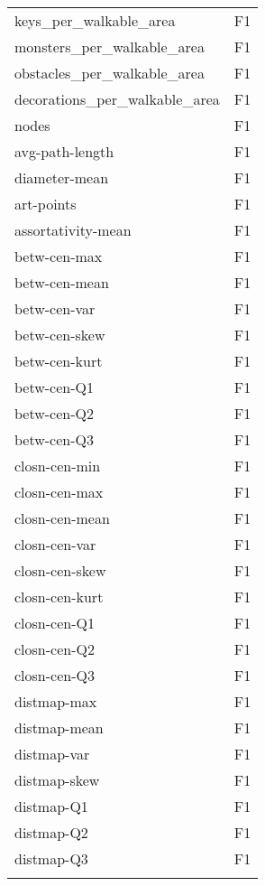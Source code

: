 \begin{longtable}{ll}
	keys\_per\_walkable\_area        &             F1 \\
	monsters\_per\_walkable\_area    &             F1 \\
	obstacles\_per\_walkable\_area   &             F1 \\
	decorations\_per\_walkable\_area &             F1 \\
	nodes                         &             F1 \\
	avg-path-length               &             F1 \\
	diameter-mean                 &             F1 \\
	art-points                    &             F1 \\
	assortativity-mean            &             F1 \\
	betw-cen-max                  &             F1 \\
	betw-cen-mean                 &             F1 \\
	betw-cen-var                  &             F1 \\
	betw-cen-skew                 &             F1 \\
	betw-cen-kurt                 &             F1 \\
	betw-cen-Q1                   &             F1 \\
	betw-cen-Q2                   &             F1 \\
	betw-cen-Q3                   &             F1 \\
	closn-cen-min                 &             F1 \\
	closn-cen-max                 &             F1 \\
	closn-cen-mean                &             F1 \\
	closn-cen-var                 &             F1 \\
	closn-cen-skew                &             F1 \\
	closn-cen-kurt                &             F1 \\
	closn-cen-Q1                  &             F1 \\
	closn-cen-Q2                  &             F1 \\
	closn-cen-Q3                  &             F1 \\
	distmap-max                   &             F1 \\
	distmap-mean                  &             F1 \\
	distmap-var                   &             F1 \\
	distmap-skew                  &             F1 \\
	distmap-Q1                    &             F1 \\
	distmap-Q2                    &             F1 \\
	distmap-Q3                    &             F1 \\
	\label{tab:results-f1-features}
\end{longtable}

